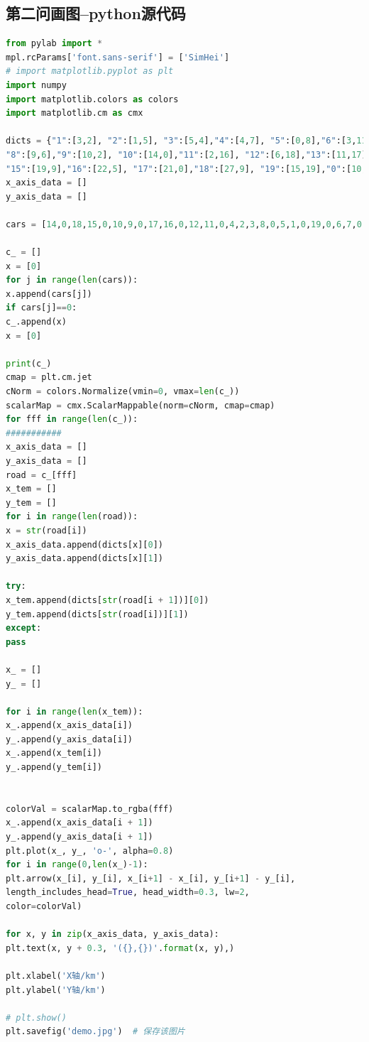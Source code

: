 \documentclass{whutmod}
\begin{document}
\subsection{第二问画图--python源代码}
\begin{lstlisting}[language=python]
from pylab import *
mpl.rcParams['font.sans-serif'] = ['SimHei']
# import matplotlib.pyplot as plt
import numpy
import matplotlib.colors as colors
import matplotlib.cm as cmx

dicts = {"1":[3,2], "2":[1,5], "3":[5,4],"4":[4,7], "5":[0,8],"6":[3,11],"7":[7,9],
"8":[9,6],"9":[10,2], "10":[14,0],"11":[2,16], "12":[6,18],"13":[11,17],"14":[15,12],
"15":[19,9],"16":[22,5], "17":[21,0],"18":[27,9], "19":[15,19],"0":[10,10],}
x_axis_data = []
y_axis_data = []

cars = [14,0,18,15,0,10,9,0,17,16,0,12,11,0,4,2,3,8,0,5,1,0,19,0,6,7,0,13]

c_ = []
x = [0]
for j in range(len(cars)):
x.append(cars[j])
if cars[j]==0:
c_.append(x)
x = [0]

print(c_)
cmap = plt.cm.jet
cNorm = colors.Normalize(vmin=0, vmax=len(c_))
scalarMap = cmx.ScalarMappable(norm=cNorm, cmap=cmap)
for fff in range(len(c_)):
###########
x_axis_data = []
y_axis_data = []
road = c_[fff]
x_tem = []
y_tem = []
for i in range(len(road)):
x = str(road[i])
x_axis_data.append(dicts[x][0])
y_axis_data.append(dicts[x][1])

try:
x_tem.append(dicts[str(road[i + 1])][0])
y_tem.append(dicts[str(road[i])][1])
except:
pass

x_ = []
y_ = []

for i in range(len(x_tem)):
x_.append(x_axis_data[i])
y_.append(y_axis_data[i])
x_.append(x_tem[i])
y_.append(y_tem[i])


colorVal = scalarMap.to_rgba(fff)
x_.append(x_axis_data[i + 1])
y_.append(y_axis_data[i + 1])
plt.plot(x_, y_, 'o-', alpha=0.8)
for i in range(0,len(x_)-1):
plt.arrow(x_[i], y_[i], x_[i+1] - x_[i], y_[i+1] - y_[i],
length_includes_head=True, head_width=0.3, lw=2,
color=colorVal)

for x, y in zip(x_axis_data, y_axis_data):
plt.text(x, y + 0.3, '({},{})'.format(x, y),)

plt.xlabel('X轴/km')
plt.ylabel('Y轴/km')

# plt.show()
plt.savefig('demo.jpg')  # 保存该图片
\end{lstlisting}
\end{document}
